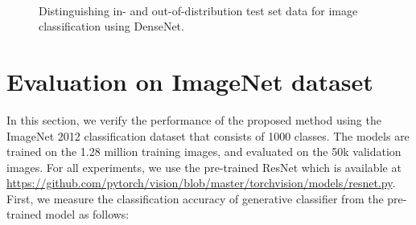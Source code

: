 \documentclass{article}
\begin{document}
\begin{figure*} [h] \centering
{} 
\vspace{-0.1in}
\,
\,
\vspace{-0.1in}
\caption{Distinguishing in- and out-of-distribution test set data for image classification using DenseNet.}
\label{fig:odin_lid_our_densenet}
\end{figure*}




\section{Evaluation on ImageNet dataset}

In this section, we verify the performance of the proposed method using the ImageNet 2012 classification dataset \citep{deng2009imagenet} that consists of 1000 classes. The models
are trained on the 1.28 million training images, and evaluated on the 50k validation images. For all experiments, we use the pre-trained ResNet \citep{he2016deep} which is available at \url{https://github.com/pytorch/vision/blob/master/torchvision/models/resnet.py}. First, we measure the classification accuracy of generative classifier from the pre-trained model as follows: 
\end{document}

